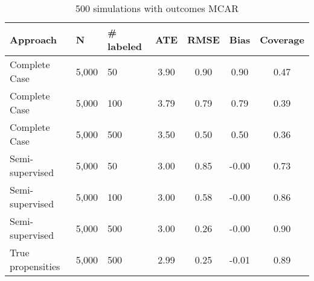 \begin{table}[ht]
\centering
\begingroup\small
\begin{tabular}{lllcc>{\columncolor[gray]{.9}}c>{\columncolor[gray]{.9}}c}
  \hline
Approach & N & \# labeled & ATE & RMSE & Bias & Coverage \\ 
  \hline
  Complete Case & 5,000 &  50 & 3.90 & 0.90 & 0.90 & 0.47 \\ 
  Complete Case & 5,000 & 100 & 3.79 & 0.79 & 0.79 & 0.39 \\ 
Complete Case & 5,000 & 500 & 3.50 & 0.50 & 0.50 & 0.36 \\ 
   \rowcolor[gray]{.8} Semi-supervised & 5,000 &  50 & 3.00 & 0.85 & -0.00 & 0.73 \\ 
   \rowcolor[gray]{.7} Semi-supervised & 5,000 & 100 & 3.00 & 0.58 & -0.00 & 0.86 \\ 
   \rowcolor[gray]{.6} Semi-supervised & 5,000 & 500 & 3.00 & 0.26 & -0.00 & 0.90 \\ 
   \rowcolor[gray]{.5} True propensities & 5,000 & 500 & 2.99 & 0.25 & -0.01 & 0.89 \\ 
   \hline
\end{tabular}
\endgroup
\caption{500 simulations with outcomes MCAR} 
\end{table}
